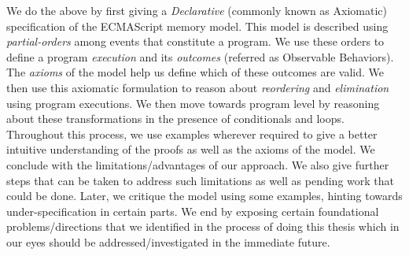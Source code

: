 We do the above by first giving a \textit{Declarative} (commonly known as Axiomatic) specification of the ECMAScript memory model. 
This model is described using \textit{partial-orders} among events that constitute a program.
We use these orders to define a program \textit{execution} and its \textit{outcomes} (referred as Observable Behaviors).
The \textit{axioms} of the model help us define which of these outcomes are valid.
We then use this axiomatic formulation to reason about \textit{reordering} and \textit{elimination} using program executions.
We then move towards program level by reasoning about these transformations in the presence of conditionals and loops. 
Throughout this process, we use examples wherever required to give a better intuitive understanding of the proofs as well as the axioms of the model. 
We conclude with the limitations/advantages of our approach.
We also give further steps that can be taken to address such limitations as well as pending work that could be done.
Later, we critique the model using some examples, hinting towards under-specification in certain parts.
We end by exposing certain foundational problems/directions that we identified in the process of doing this thesis which in our eyes should be addressed/investigated in the immediate future.

